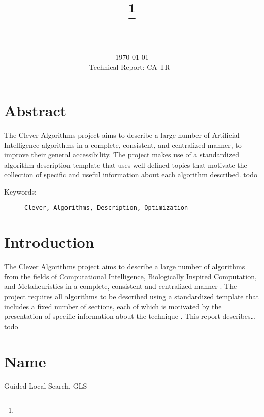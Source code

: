 \documentclass[a4paper, 11pt]{article}
\title{{\myreporttitle}\footnote{\myreportlicense}}
\author{\myreportauthor\\{\myreportemail}\\\small\myreportproject}
\date{\today\\{\small{Technical Report: CA-TR-{\myreportdate}-\myreportversion}}}
\begin{document}
\maketitle

\section*{Abstract} 
The Clever Algorithms project aims to describe a large number of Artificial Intelligence algorithms in a complete, consistent, and centralized manner, to improve their general accessibility. 
The project makes use of a standardized algorithm description template that uses well-defined topics that motivate the collection of specific and useful information about each algorithm described.
todo

\begin{description}
	\item[Keywords:] {\small\texttt{Clever, Algorithms, Description, Optimization}}
\end{description} 

\section{Introduction} 
\label{sec:intro}
The Clever Algorithms project aims to describe a large number of algorithms from the fields of Computational Intelligence, Biologically Inspired Computation, and Metaheuristics in a complete, consistent and centralized manner \cite{Brownlee2010}.
The project requires all algorithms to be described using a standardized template that includes a fixed number of sections, each of which is motivated by the presentation of specific information about the technique \cite{Brownlee2010a}.
This report describes\ldots todo

\section{Name} 
\label{sec:name}
Guided Local Search, GLS
\end{document}
